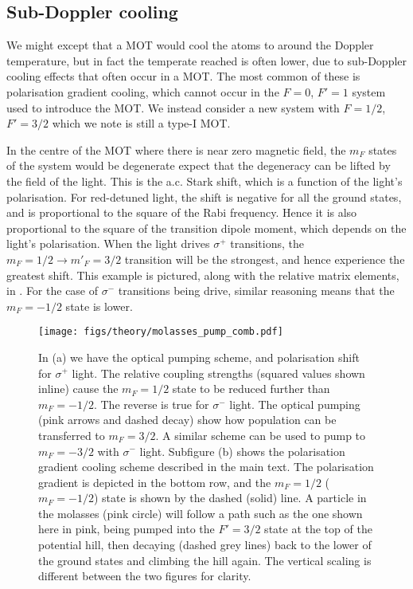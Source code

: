 \subsection{Sub-Doppler cooling}

We might except that a MOT would cool the atoms to around the Doppler
temperature, but in fact the temperate reached is often lower, due to
sub-Doppler cooling effects that often occur in a MOT. The most common of these
is polarisation gradient cooling, which cannot occur in the $F=0$, $F'=1$
system used to introduce the MOT. We instead consider a new system with
$F=1/2$, $F'=3/2$ which we note is still a type-I MOT.

In the centre of the MOT where there is near zero magnetic field, the $m_F$
states of the system would be degenerate expect that the degeneracy can be
lifted by the field of the light. This is the a.c. Stark shift, which is a
function of the light's polarisation.
%
For red-detuned light, the shift is negative for all the ground states, and is
proportional to the square of the Rabi frequency. Hence it is also proportional
to the square of the transition dipole moment, which depends on the light's
polarisation.
%
When the light drives $\sigma^+$ transitions, the $m_F=1/2 \rightarrow
m'_F=3/2$ transition will be the strongest, and hence experience the greatest
shift. This example is pictured, along with the relative matrix elements, in 
. For the case of $\sigma^-$ transitions
being drive, similar reasoning means that the $m_F=-1/2$ state is lower.

\begin{figure}[htb]
  \centering
  \texttt{[image: figs/theory/molasses\_pump\_comb.pdf]}
    \caption{In (a) we have the optical pumping scheme, and polarisation shift
      for $\sigma^+$ light. The relative coupling strengths (squared values
      shown inline) cause the $m_F=1/2$ state to be reduced further than
      $m_F=-1/2$.  The reverse is true for $\sigma^-$ light. The optical
      pumping (pink arrows and dashed decay) show how population can be
      transferred to $m_F=3/2$. A similar scheme can be used to pump to
      $m_F=-3/2$ with $\sigma^-$ light. Subfigure (b) shows the polarisation
      gradient cooling scheme described in the main text.  The polarisation
      gradient is depicted in the bottom row, and the $m_F=1/2$ ($m_F=-1/2$)
      state is shown by the dashed (solid) line. A particle in the molasses
      (pink circle) will follow a path such as the one shown here in pink,
      being pumped into the $F'=3/2$ state at the top of the potential hill,
      then decaying (dashed grey lines) back to the lower of the ground states
      and climbing the hill again. The vertical scaling is different between
      the two figures for clarity.
  }
  \label{theory:fig:subdoppler}
\end{figure}

